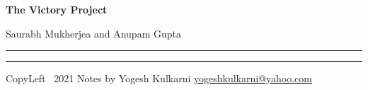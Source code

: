 % 

\usepackage{beamerarticle} %



\begin{center}
     \Large{\textbf{The Victory Project}}  %
		 
		 \small{Saurabh Mukherjea and Anupam Gupta} 

\end{center}
\rule{\linewidth}{0.25pt}
\raggedright
\footnotesize
\begin{multicols}{3}




\rule{0.3\linewidth}{0.25pt}

\scriptsize
CopyLeft \textcopyleft\ 2021 Notes by Yogesh Kulkarni
\href{http://www.yogeshkulkarni.com}{yogeshkulkarni@yahoo.com}

\end{multicols}

